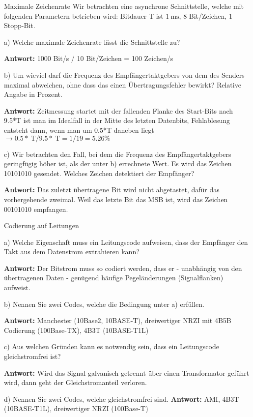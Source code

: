  \begin{example2}{Maximale Zeichenrate}
 Wir betrachten eine asynchrone Schnittstelle, welche mit folgenden Parametern betrieben wird: Bitdauer T ist $1 \mathrm{~ms}$, 8 Bit/Zeichen, 1 Stopp-Bit.
 
 a) Welche maximale Zeichenrate lässt die Schnittstelle zu?
 
 \textbf{Antwort:}
 1000 Bit/s / 10 Bit/Zeichen = 100 Zeichen/s
 
 b) Um wieviel darf die Frequenz des Empfängertaktgebers von dem des Senders maximal abweichen, ohne dass das einen Übertragungsfehler bewirkt? Relative Angabe in Prozent.
 
 \textbf{Antwort:}
 Zeitmessung startet mit der fallenden Flanke des Start-Bits nach 9.5*T ist man im Idealfall in der Mitte des letzten Datenbits,
 Fehlablesung entsteht dann, wenn man um 0.5*T daneben liegt $\rightarrow 0.5 * \mathrm{~T} / 9.5 * \mathrm{~T}=1 / 19=5.26 \%$

 c) Wir betrachten den Fall, bei dem die Frequenz des Empfängertaktgebers geringfügig höher ist, als der unter b) errechnete Wert. Es wird das Zeichen 10101010 gesendet. Welches Zeichen detektiert der Empfänger?

 \textbf{Antwort:}
Das zuletzt übertragene Bit wird nicht abgetastet, dafür das vorhergehende zweimal. Weil das letzte Bit das MSB ist, wird das Zeichen 00101010 empfangen.
 \end{example2}



 \begin{example2}{Codierung auf Leitungen}

  a) Welche Eigenschaft muss ein Leitungscode aufweisen, dass der Empfänger den Takt aus dem Datenstrom extrahieren kann?
  
  \textbf{Antwort:} Der Bitstrom muss so codiert werden, dass er - unabhängig von den übertragenen Daten - genügend häufige Pegeländerungen (Signalflanken) aufweist.
  
  b) Nennen Sie zwei Codes, welche die Bedingung unter a) erfüllen.
  
  \textbf{Antwort:} Manchester (10Base2, 10BASE-T), dreiwertiger NRZI mit 4B5B Codierung (100Base-TX), 4B3T (10BASE-T1L)
  
  c) Aus welchen Gründen kann es notwendig sein, dass ein Leitungscode gleichstromfrei ist? 
  
  \textbf{Antwort:} Wird das Signal galvanisch getrennt über einen Transformator geführt wird, dann geht der Gleichstromanteil verloren.
  
  d) Nennen Sie zwei Codes, welche gleichstromfrei sind. \textbf{Antwort:} AMI, 4B3T (10BASE-T1L), dreiwertiger NRZI (100Base-T)
 \end{example2}

